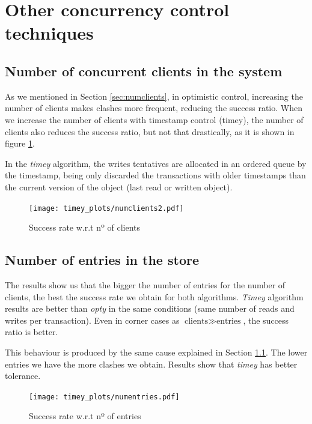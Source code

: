 \documentclass[a4paper, 10pt]{article}
\begin{document}
\clearpage
\section{Other concurrency control techniques}


\subsection{Number of concurrent clients in the system}\label{timey-current-clients}

As we mentioned in Section \ref{sec:numclients}, in optimistic control, increasing the number of clients makes clashes more frequent, reducing the success ratio. When we increase the number of clients with timestamp control (timey), the number of clients also reduces the success ratio, but not that drastically, as it is shown in figure \ref{timey:numclients}. 

In the \textit{timey} algorithm, the writes tentatives are allocated in an ordered queue by the timestamp, being only discarded the transactions with older timestamps than the current version of the object (last read or written object).

\begin{figure}[H]
  \centering
  \texttt{[image: timey\_plots/numclients2.pdf]}
    \caption{Success rate w.r.t nº of clients}
    \label{timey:numclients}
\end{figure} 

\clearpage
\subsection{Number of entries in the store}

The results show us that the bigger the number of entries for the number of clients, the best the success rate we obtain for both algorithms. \textit{Timey} algorithm results are better than \textit{opty} in the same conditions (same number of reads and writes per transaction). Even in corner cases as $\text{clients} \gg \text{entries}$, the success ratio is better. 

This behaviour is produced by the same cause explained in Section \ref{timey-current-clients}. The lower entries we have the more clashes we obtain. Results show that \textit{timey} has better tolerance.

\begin{figure}[H]
  \centering
  \texttt{[image: timey\_plots/numentries.pdf]}
    \caption{Success rate w.r.t nº of entries}
    \label{timey:numentries}
\end{figure} 
\end{document}
